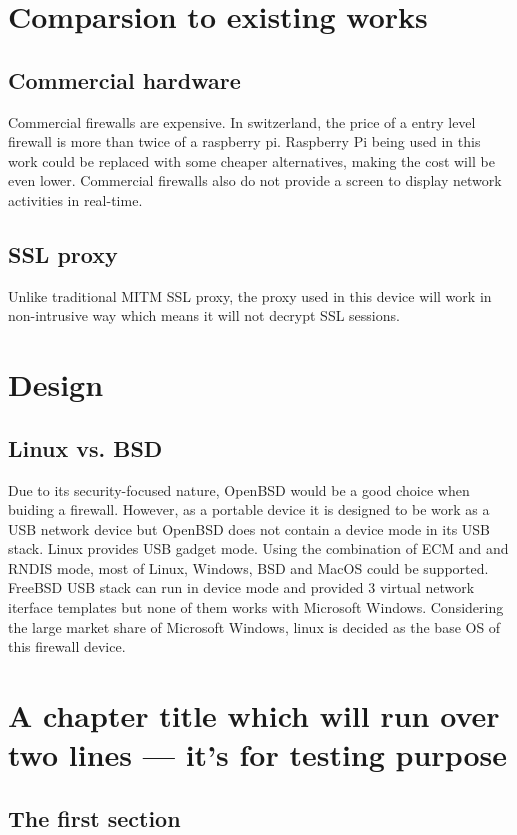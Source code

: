 \documentclass[mscthesis]{usiinfthesis}
\begin{document}
\chapter{Comparsion to existing works}
\section{Commercial hardware}
Commercial firewalls are expensive. In switzerland, the price of a entry 
level firewall is more than twice of a raspberry pi. Raspberry Pi being
used in this work could be replaced with some cheaper alternatives, making 
the cost will be even lower. Commercial firewalls also do not provide a 
screen to display network activities in real-time.

\section{SSL proxy}
Unlike traditional MITM SSL proxy, the proxy used in this device will work 
in non-intrusive way which means it will not decrypt SSL sessions.

\chapter[Design]{Design}

\section{Linux vs. BSD}

Due to its security-focused nature, OpenBSD would be a good choice when buiding a firewall. However, as a portable device it is designed to be work as a USB network device but OpenBSD does not contain a device mode in its USB stack. Linux provides USB gadget mode. Using the combination of ECM and and RNDIS mode, most of Linux, Windows, BSD and MacOS could be supported. FreeBSD USB stack can run in device mode and provided 3 virtual network iterface templates but none of them works with Microsoft Windows\citet{freebsdhb:usb}. Considering the large market share of Microsoft Windows, linux is decided as the base OS of this firewall device.


\chapter[Short title]{A chapter title which will run over two lines --- it's for
  testing purpose}

\section{The first section}
\end{document}
